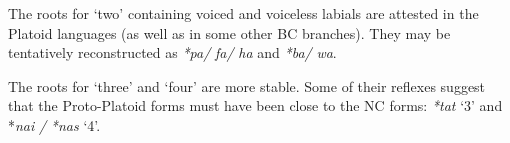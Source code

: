 The roots for ‘two’ containing voiced and voiceless labials are attested in the Platoid languages (as well as in some other BC branches). They may be tentatively reconstructed as \textit{*pa/} \textit{fa/} \textit{ha} and \textit{*ba/} \textit{wa}.

The roots for ‘three’ and ‘four’ are more stable. Some of their reflexes suggest that the Proto-Platoid forms must have been close to the NC forms: \textit{*tat} ‘3’ and *\textit{nai} \textit{/} \textit{*nas} ‘4’.


\begin{table}
\caption{\label{tab:3:44}Platoid stems and patterns for `5' and `6'}
\small
{}
\end{table}
